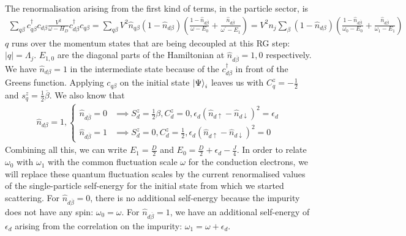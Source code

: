 \documentclass[reprint,superscriptaddress,floatfix]{revtex4-2}
\begin{document}
\begin{widetext}
The renormalisation arising from the first kind of terms, in the particle sector, is
\begin{equation}\begin{aligned}
	\sum_{q\beta}c^\dagger_{q\beta}c_{d\beta}\frac{V^2}{\omega - H_D}c^\dagger_{d\beta}c_{q\beta} = \sum_{q\beta}V^2 \hat n_{q\beta} \left( 1 - \hat n_{d\beta} \right)\left( \frac{1-\hat n_{d \overline\beta }}{\omega - E_0} + \frac{\hat n_{d \overline\beta}}{\omega^\prime - E_1}\right) = V^2 n_j\sum_{\beta}\left( 1 - \hat n_{d\beta} \right)\left( \frac{1-\hat n_{d \overline\beta }}{\omega_0 - E_0} + \frac{\hat n_{d \overline\beta}}{\omega_1 - E_1}\right)
\end{aligned}\end{equation}
\(q\) runs over the momentum states that are being decoupled at this RG step: \(|q| = \Lambda_j\). \(E_{1,0}\) are the diagonal parts of the Hamiltonian at \(\hat n_{d\overline \beta}=1,0\) respectively. We have \(\hat n_{d\beta}=1\) in the intermediate state because of the \(c^\dagger_{d\beta}\) in front of the Greens function. Applying \(c_{q\beta}\) on the initial state \(\ket{\Psi}_i\) leaves us with \(C^z_q = - \frac{1}{2}\) and \(s^z_q = \frac{1}{2}\overline\beta\). We also know that
\begin{equation}\begin{aligned}
	\hat n_{d\beta}=1,
	\begin{cases}
		\hat n_{d\overline\beta}=0 &\implies S_d^z = \frac{1}{2}\beta, C_d^z = 0, \epsilon_d\left(\hat n_{d\uparrow} - \hat n_{d \downarrow}\right)^2 = \epsilon_d\\	
		\hat n_{d\overline\beta}=1 &\implies S_d^z = 0, C_d^z = \frac{1}{2}, \epsilon_d\left(\hat n_{d\uparrow} - \hat n_{d \downarrow}\right)^2 = 0
	\end{cases}
\end{aligned}\end{equation}
Combining all this, we can write \(E_1 = \frac{D}{2}\) and \(E_0 = \frac{D}{2} + \epsilon_d - \frac{J}{4}\). In order to relate \(\omega_0\) with \(\omega_1\) with the common fluctuation scale \(\omega\) for the conduction electrons, we will replace these quantum fluctuation scales by the current renormalised values of the single-particle self-energy for the initial state from which we started scattering. For \(\hat n_{d\overline\beta}=0\), there is no additional self-energy because the impurity does not have any spin: \(\omega_0 = \omega\). For \(\hat n_{d\overline\beta} = 1\), we have an additional self-energy of \(\epsilon_d\) arising from the correlation on the impurity: \(\omega_1 = \omega + \epsilon_d\).

\end{widetext}
\end{document}

